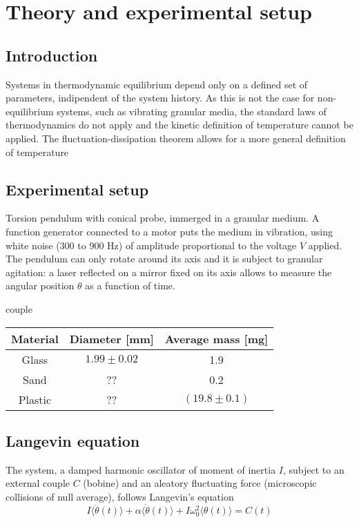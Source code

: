 \section{Theory and experimental setup}
\subsection{Introduction}
Systems in thermodynamic equilibrium depend only on a defined set of parameters, indipendent of the system history.
As this is not the case for non-equilibrium systems, such as vibrating granular media, the standard laws of thermodynamics do not apply and the kinetic definition of temperature cannot be applied.
The fluctuation-dissipation theorem allows for a more general definition of temperature

\subsection{Experimental setup}
Torsion pendulum with conical probe, immerged in a granular medium.
A function generator connected to a motor puts the medium in vibration, using white noise (300 to 900 Hz) of amplitude proportional to the voltage $V$ applied.
The pendulum can only rotate around its axis and it is subject to granular agitation: a laser reflected on a mirror fixed on its axis allows to measure the angular position $\theta$ as a function of time.

couple

\begin{table}[htbp]
    \begin{tabular}{c c c}
        Material & Diameter [mm] & Average mass [mg] \\
        \hline
        Glass & $1.99 \pm 0.02$ & 1.9\\
        Sand & ?? & 0.2 \\
        Plastic & ?? &  $(19.8 \pm 0.1)$
    \end{tabular}
\end{table}

\subsection{Langevin equation}
The system, a damped harmonic oscillator of moment of inertia $I$, subject to an external couple $C$ (bobine) and an aleatory fluctuating force (microscopic collisions of null average), follows Langevin's equation
\begin{equation}
    I \langle \ddot{\theta} (t) \rangle + \alpha \langle \dot{\theta}(t) \rangle + I \omega_0^2 \langle \theta(t) \rangle = C(t)
\end{equation}

